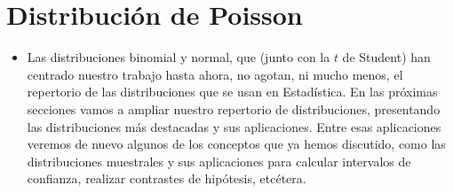 \section{Distribución de Poisson}

\begin{itemize}

    \item Las distribuciones binomial y normal, que (junto con la $t$ de Student) han centrado nuestro trabajo hasta ahora, no agotan, ni mucho menos, el repertorio de las distribuciones que se usan en
    Estadística. En las próximas secciones vamos a ampliar nuestro repertorio de distribuciones, presentando las distribuciones más destacadas y sus aplicaciones. Entre esas aplicaciones veremos de nuevo algunos de los conceptos que ya hemos discutido, como las distribuciones muestrales y sus aplicaciones para calcular intervalos de confianza, realizar contrastes de hipótesis, etcétera.



\end{itemize}
